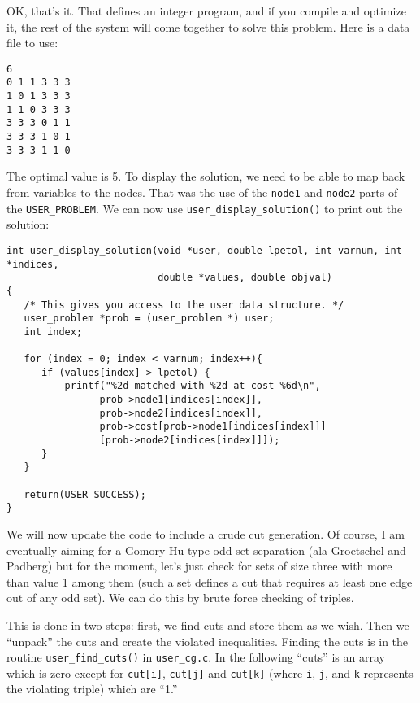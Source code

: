 \documentclass[11pt]{article}
\begin{document}
OK, that's it. That defines an integer program, and if you compile and
optimize it, the rest of the system will come together to solve this problem.
Here is a data file to use:
\begin{verbatim}
6
0 1 1 3 3 3
1 0 1 3 3 3
1 1 0 3 3 3
3 3 3 0 1 1
3 3 3 1 0 1
3 3 3 1 1 0
\end{verbatim}

The optimal value is 5. To display the solution, we need to be able to map
back from variables to the nodes. That was the use of the \texttt{node1} and
\texttt{node2} parts of the \texttt{USER\_PROBLEM}. We can now use
\texttt{user\_display\_solution()} to print out the solution:

\begin{verbatim}
int user_display_solution(void *user, double lpetol, int varnum, int *indices,
                          double *values, double objval)
{
   /* This gives you access to the user data structure. */
   user_problem *prob = (user_problem *) user;
   int index;
 
   for (index = 0; index < varnum; index++){
      if (values[index] > lpetol) {
          printf("%2d matched with %2d at cost %6d\n",
                prob->node1[indices[index]],
                prob->node2[indices[index]],
                prob->cost[prob->node1[indices[index]]]
                [prob->node2[indices[index]]]);
      }	   
   }
   
   return(USER_SUCCESS);
}
\end{verbatim}

We will now update the code to include a crude cut generation. Of course, I am
eventually aiming for a Gomory-Hu type odd-set separation (ala Groetschel and
Padberg) but for the moment, let's just check for sets of size three with more
than value 1 among them (such a set defines a cut that requires at least one
edge out of any odd set). We can do this by brute force checking of triples.

This is done in two steps: first, we find cuts and store them as we wish. Then
we ``unpack'' the cuts and create the violated inequalities. Finding the cuts
is in the routine \texttt{user\_find\_cuts()} in \texttt{user\_cg.c}. In the
following ``cuts'' is an array which is zero except for \texttt{cut[i]},
\texttt{cut[j]} and \texttt{cut[k]} (where \texttt{i}, \texttt{j}, and
\texttt{k} represents the violating triple) which are ``1.''
\end{document}
